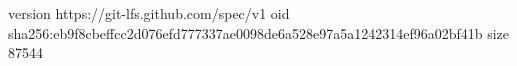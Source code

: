 version https://git-lfs.github.com/spec/v1
oid sha256:eb9f8cbeffcc2d076efd777337ae0098de6a528e97a5a1242314ef96a02bf41b
size 87544
